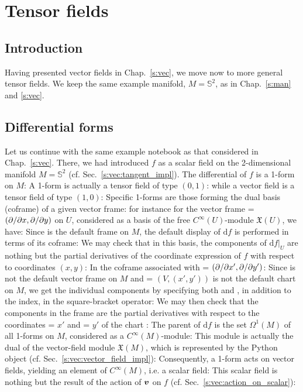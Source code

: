 \chapter{Tensor fields} \label{s:ten}

\minitoc

\section{Introduction}

Having presented vector fields in Chap.~\ref{s:vec}, we move now to more
general tensor fields. We keep the same example manifold, $M = \mathbb{S}^2$,
as in Chap.~\ref{s:man} and \ref{s:vec}.

\section{Differential forms}

Let us continue with the same example notebook as that considered in
Chap.~\ref{s:vec}. There, we had introduced $f$ as a scalar field on
the 2-dimensional manifold $M = \mathbb{S}^2$ (cf. Sec.~\ref{s:vec:tangent_impl}).
The differential of $f$ is a 1-form on $M$:
A 1-form is actually a tensor field of type $(0,1)$:
while a vector field is a tensor field of type $(1,0)$:
Specific 1-forms are those forming the dual basis (coframe) of a given vector
frame: for instance for the vector frame  = $({\partial }/{\partial x},{\partial }/{\partial y})$
on $U$, considered as a basis of the free $C^\infty(U)$-module $\mathfrak{X}(U)$,
we have:
Since  is the default frame on $M$, the default display of $\mathrm{d}f$
is performed in terms of its coframe:
We may check that in this basis, the components of $\left. \mathrm{d}f \right| _U$
are nothing but the partial derivatives of the coordinate expression of $f$
with respect to coordinates $(x,y)$:
In the coframe associated with  = $({\partial }/{\partial x'},{\partial }/{\partial y'})$:
Since  is not the default vector frame on $M$ and  = $(V,(x',y'))$
is not the default chart on $M$, we get the individual components by
specifying both  and , in addition to the index, in the
square-bracket operator:
We may then check that the components in the frame 
are the partial derivatives with respect to the coordinates  = $x'$ and
 = $y'$ of the chart :
The parent of $\mathrm{d}f$ is the set $\Omega^1(M)$ of all 1-forms on $M$,
considered as a $C^\infty(M)$-module:
This module is actually the dual of the vector-field module $\mathfrak{X}(M)$,
which is represented
by the Python object  (cf. Sec.~\ref{s:vec:vector_field_impl}):
Consequently, a 1-form acts on vector fields, yielding an element of
$C^\infty(M)$, i.e. a scalar field:
This scalar field is nothing but the result of the action of $\bm{v}$ on $f$
(cf. Sec.~\ref{s:vec:action_on_scalar}):

